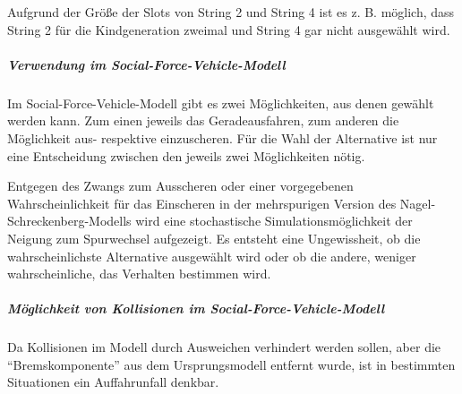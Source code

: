 Aufgrund der Größe der Slots von String 2 und String 4 ist es z. B. möglich, dass String 2 für die Kindgeneration zweimal und String 4 gar nicht ausgewählt wird.


\subparagraph{Verwendung im Social-Force-Vehicle-Modell}

Im Social-Force-Vehicle-Modell gibt es zwei Möglichkeiten, aus denen gewählt werden kann. 
Zum einen jeweils das Geradeausfahren, zum anderen die Möglichkeit aus- respektive einzuscheren.
Für die Wahl der Alternative ist nur eine Entscheidung zwischen den jeweils zwei Möglichkeiten nötig.

Entgegen des Zwangs zum Ausscheren oder einer vorgegebenen Wahrscheinlichkeit für das Einscheren in der mehrspurigen Version des Nagel-Schreckenberg-Modells wird eine stochastische Simulationsmöglichkeit der Neigung zum Spurwechsel aufgezeigt.
Es entsteht eine Ungewissheit, ob die wahrscheinlichste Alternative ausgewählt wird oder ob die andere, weniger wahrscheinliche, das Verhalten bestimmen wird. 

\subparagraph{Möglichkeit von Kollisionen im Social-Force-Vehicle-Modell}

Da Kollisionen im Modell durch Ausweichen verhindert werden sollen, aber die \enquote{Bremskomponente} aus dem Ursprungsmodell entfernt wurde, ist in bestimmten Situationen ein Auffahrunfall denkbar.



